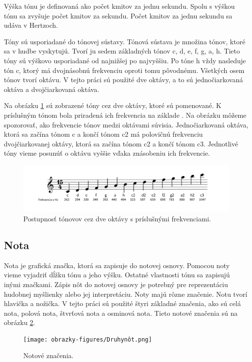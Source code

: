 Výška tónu je definovaná ako počet kmitov za jednu sekundu. Spolu s výškou tónu sa zvyšuje počet kmitov za sekundu. Počet kmitov za jednu sekundu sa udáva v Hertzoch.

Tóny sú usporiadané do tónovej sústavy. Tónová sústava je množina tónov, ktoré sa v hudbe vyskytujú. Tvorí ju sedem základných tónov c, d, e, f, g, a, h. Tieto tóny sú výškovo usporiadané od najnižšej po najvyššiu. Po tóne h vždy nasleduje tón c, ktorý má dvojnásobnú frekvenciu oproti tomu pôvodnému. Všetkých osem tónov tvorí oktávu. V tejto práci sú použité dve oktávy, a to sú jednočiarkovaná oktáva a dvojčiarkovaná oktáva.

Na obrázku \ref{fig:tonfrek} sú zobrazené tóny cez dve oktávy, ktoré sú pomenované. K príslušným tónom bola priradená ich frekvencia na základe \cite{strankaFrekvencii}. Na obrázku môžeme spozorovať, ako frekvencie tónov medzi oktávami súvisia. Jednočiarkovaná oktáva, ktorá sa začína tónom c a končí tónom c2 má polovičnú frekvenciu dvojčiarkovanej oktávy, ktorá sa začína tónom c2 a končí tónom c3. Jednotlivé tóny vieme posunúť o oktávu vyššie vďaka znásobeniu ich frekvencie.

\begin{figure}[H]
\centering
\includegraphics[scale=0.4]{obrazky-figures/Tonyafrekvencie.png}
\caption{Postupnosť tónovov cez dve oktávy s príslušnými frekvenciami.}
\label{fig:tonfrek}
\end{figure}

\subsection{Nota}
\label{subs:nota}
Nota je grafická značka, ktorá sa zapisuje do notovej osnovy. Pomocou noty vieme vyjadriť dĺžku tónu a jeho výšku. Ostatné vlastnosti tónu sa zapisujú inými značkami. Zápis nôt do notovej osnovy je potrebný pre reprezentáciu hudobnej myšlienky alebo jej interpretáciu. Noty majú rôzne značenie. Notu tvorí hlavička a nožička. V tejto práci sú použité štyri základné značenia, ako sú celá nota, polová nota, štvrťová nota a osminová nota. Tieto notové značenia sú na obrázku \ref{fig:druhnot}.

\begin{figure}[H]
\centering
\texttt{[image: obrazky-figures/Druhynôt.png]}
\caption{Notové značenia.}
\label{fig:druhnot}
\end{figure}

